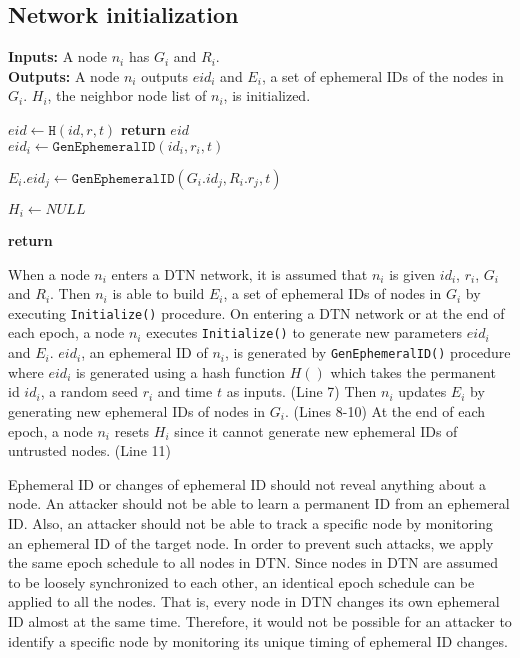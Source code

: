 \documentclass[11pt]{article}
\begin{document}
\subsection{Network initialization}

\begin{framed}
\noindent
\textbf{Inputs:} A node $n_i$ has $G_i$ and $R_i$. \\

\noindent
\textbf{Outputs:} A node $n_i$ outputs $eid_i$ and $E_i$, a set of ephemeral IDs of the nodes in $G_i$.  $H_i$, the neighbor node list of $n_i$, is initialized. \\

\begin{algorithmic}[1]
    \State $eid \leftarrow \texttt{H}(id, r, t)$
    \State \textbf{return} $eid$
  \EndProcedure\\

    \State $eid_i \leftarrow \texttt{GenEphemeralID}(id_i, r_i, t)$

	  \State $E_i.eid_j \leftarrow \texttt{GenEphemeralID}(G_i.id_j, R_i.r_j, t)$
	\EndFor
	
	\State $H_i \leftarrow NULL$
    
    \State \textbf{return}  
  \EndProcedure  
\end{algorithmic}
\end{framed}

When a node $n_i$ enters a DTN network, it is assumed that $n_i$ is given $id_i$, $r_i$, $G_i$ and  $R_i$.  
Then $n_i$ is able to build $E_i$, a set of ephemeral IDs of nodes in $G_i$ by executing \texttt{Initialize()} procedure.  
On entering a DTN network or at the end of each epoch, a node $n_i$ executes \texttt{Initialize()} to generate new parameters $eid_i$ and $E_i$.  
$eid_i$, an ephemeral ID of $n_i$, is generated by \texttt{GenEphemeralID()} procedure where $eid_i$ is generated using a hash function $H()$ which takes the permanent id $id_i$, a random seed $r_i$ and time $t$ as inputs. (Line 7)  
Then $n_i$ updates $E_i$ by generating new ephemeral IDs of nodes in $G_i$. (Lines 8-10)  
At the end of each epoch, a node $n_i$ resets $H_i$ since it cannot generate new ephemeral IDs of untrusted nodes. (Line 11)

Ephemeral ID or changes of ephemeral ID should not reveal anything about a node.
An attacker should not be able to learn a permanent ID from an ephemeral ID.  
Also, an attacker should not be able to track a specific node by monitoring an ephemeral ID of the target node. 
In order to prevent such attacks, we apply the same epoch schedule to all nodes in DTN. 
Since nodes in DTN are assumed to be loosely synchronized to each other, an identical epoch schedule can be applied to all the nodes.  
That is, every node in DTN changes its own ephemeral ID almost at the same time.   
Therefore, it would not be possible for an attacker to identify a specific node by monitoring its unique timing of ephemeral ID changes.
\end{document}
